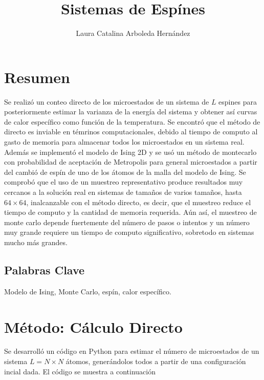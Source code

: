 \documentclass[a4paper,12pt]{article}
\title{\textbf{Sistemas de Espínes}}
\author[*]{Laura Catalina Arboleda Hernández}
\affil[*]{Instituto de Física, Universidad de Antioquia}
\date{}
\begin{document}
 \maketitle


\section{Resumen}

\noindent Se realizó un conteo directo de los microestados de un sistema de $L$ espines para posteriormente estimar la varianza de la energía del sistema y obtener así curvas de calor específico como función de la temperatura. Se encontró que el método de directo es inviable en témrinos computacionales, debido al tiempo de computo al gasto de memoria para almacenar todos los microestados en un sistema real. Además se implementó el modelo de Ising 2D y se usó un método de montecarlo con probabilidad de aceptación de Metropolis para general microestados a partir del cambió de espín de uno de los átomos de la malla del modelo de Ising. Se comprobó que el uso de un muestreo representativo produce resultados muy cercanos a la solución real en sistemas de tamaños de varios tamaños, hasta $64 \times 64$, inalcanzable con el método directo, es decir, que el muestreo reduce el tiempo de computo y la cantidad de memoria requerida. Aún así, el muestreo de monte carlo depende fuertemente del número de pasos o intentos y un número muy grande requiere un tiempo de computo significativo, sobretodo en sistemas mucho más grandes. 

\subsection*{Palabras Clave}

\noindent Modelo de Ising, Monte Carlo, espín, calor específico. 

 \section{Método: Cálculo Directo}

 \noindent Se desarrolló un código en Python para estimar el número de microestados de un sistema $L =  N\times N$ átomos, generándolos todos a partir de una configuración incial dada. El código se muestra a continuación
\end{document}
